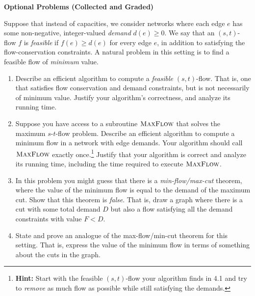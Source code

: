 \documentclass[11pt]{article}
\theoremstyle{definition}
\begin{document}
\begin{enumerate}[leftmargin=0pt]
\vspace{3ex}
\noindent\textbf{\color{red} \Large Optional Problems (Collected and Graded)}

Suppose that instead of capacities, we consider networks where each edge $e$ has some non-negative, integer-valued \emph{demand} $d(e) \geq 0$.  We say that an $(s,t)$-flow $f$ is \emph{feasible} if $f(e) \geq d(e)$ for every edge $e$, in addition to satisfying the flow-conservation constraints.  A natural problem in this setting is to find a feasible flow of \emph{minimum} value.
\begin{enumerate}[leftmargin=0pt, itemsep=1ex]
	\item Describe an efficient algorithm to compute a \emph{feasible} $(s,t)$-flow.  That is, one that satisfies flow conservation and demand constraints, but is not necessarily of minimum value.  Justify your algorithm's correctness, and analyze its running time.
	
	\item Suppose you have access to a subroutine $\textsc{MaxFlow}$ that solves the maximum $s$-$t$-flow problem. Describe an efficient algorithm to compute a minimum flow in a network with edge demands.  Your algorithm should call $\textsc{MaxFlow}$ exactly once.\footnote{\textbf{Hint:} Start with the feasible $(s,t)$-flow your algorithm finds in 4.1 and try to \emph{remove} as much flow as possible while still satisfying the demands.}  Justify that your algorithm is correct and analyze its running time, including the time required to execute $\textsc{MaxFlow}$.

    \item In this problem you might guess that there is a \emph{min-flow/max-cut} theorem, where the value of the minimum flow is equal to the demand of the maximum cut.  Show that this theorem is \emph{false}.  That is, draw a graph where there is a cut with some total demand $D$ but also a flow satisfying all the demand constraints with value $F < D$.
    
	\item State and prove an analogue of the max-flow/min-cut theorem for this setting.  That is, express the value of the minimum flow in terms of something about the cuts in the graph.
\end{enumerate}

\end{enumerate}
\end{document}
